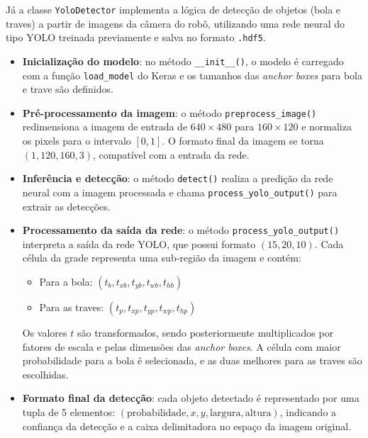 \documentclass[a4paper,12pt]{article}
\begin{document}
Já a classe \texttt{YoloDetector} implementa a lógica de detecção de objetos (bola e traves) a partir de imagens da câmera do robô, utilizando uma rede neural do tipo YOLO treinada previamente e salva no formato \texttt{.hdf5}.

\begin{itemize}
    \item \textbf{Inicialização do modelo}: no método \texttt{\_\_init\_\_()}, o modelo é carregado com a função \texttt{load\_model} do Keras e os tamanhos das \textit{anchor boxes} para bola e trave são definidos.

    \item \textbf{Pré-processamento da imagem}: o método \texttt{preprocess\_image()} redimensiona a imagem de entrada de $640 \times 480$ para $160 \times 120$ e normaliza os pixels para o intervalo $[0, 1]$. O formato final da imagem se torna $(1, 120, 160, 3)$, compatível com a entrada da rede.

    \item \textbf{Inferência e detecção}: o método \texttt{detect()} realiza a predição da rede neural com a imagem processada e chama \texttt{process\_yolo\_output()} para extrair as detecções.

    \item \textbf{Processamento da saída da rede}: o método \texttt{process\_yolo\_output()} interpreta a saída da rede YOLO, que possui formato $(15, 20, 10)$. Cada célula da grade representa uma sub-região da imagem e contém:

    \begin{itemize}
        \item Para a bola: $(t_b, t_{xb}, t_{yb}, t_{wb}, t_{hb})$
        \item Para as traves: $(t_p, t_{xp}, t_{yp}, t_{wp}, t_{hp})$
    \end{itemize}

    Os valores $t$ são transformados, sendo posteriormente multiplicados por fatores de escala e pelas dimensões das \textit{anchor boxes}. A célula com maior probabilidade para a bola é selecionada, e as duas melhores para as traves são escolhidas.

    \item \textbf{Formato final da detecção}: cada objeto detectado é representado por uma tupla de 5 elementos: $(\text{probabilidade}, x, y, \text{largura}, \text{altura})$, indicando a confiança da detecção e a caixa delimitadora no espaço da imagem original.
\end{itemize}
\end{document}
